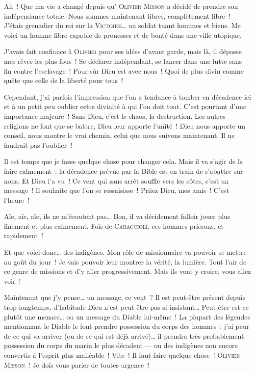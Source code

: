 {
		Ah~!  Que ma vie a changé depuis qu’ \textsc{Olivier Misson} a décidé de prendre son indépendance totale.
		Nous sommes maintenant libres, complètement libre~!
		J’étais grenadier du roi sur la \textsc{Victoire}… un soldat tuant hommes et biens.
		Me voici un homme libre capable de prouesses et de bonté dans une ville utopique.

		J’avais fait confiance à \textsc{Olivier} pour ses idées d’avant garde, mais là, il dépasse mes rêves les plus fous~!
		Se déclarer indépendant, se lancer dans une lutte sans fin contre l’esclavage~!
		Pour sûr Dieu est avec nous~!  Quoi de plus divin comme quête que celle de la liberté pour tous~!

		Cependant, j’ai parfois l’impression que l’on a tendance à tomber en décadence ici et à un petit peu oublier cette divinité à qui l’on doit tout.
		C’est pourtant d’une importance majeure~!  Sans Dieu, c’est le chaos, la destruction.
		Les autres religions ne font que se battre, Dieu leur apporte l’unité~!
		Dieu nous apporte un conseil, nous montre le vrai chemin, celui que nous suivons maintenant.
		Il ne faudrait pas l’oublier~!

		Il est temps que je fasse quelque chose pour changer cela.
		Mais il va s’agir de le faire calmement~:  la décadence prévue par la Bible est en train de s’abattre sur nous.
		Et Dieu l’a vu~!  Ce vent qui sans arrêt souffle vers les côtes, c’est un message~!
		Il souhaite que l’on se ressaisisse~!  Priiez Dieu, mes amis~!  C’est l’heure~!

		Aïe, aïe, aïe, ils ne m’écoutent pas…  Bon, il va décidement falloir jouer plus finement et plus calmement.
		Fois de \textsc{Caraccioli}, ces hommes prierons, et rapidement~!

		Et que voici donc… des indigènes.  Mon rôle de missionnaire va pouvoir se mettre au goût du jour~!
		Je vais pouvoir leur montrer la vérité, la lumière.
		Tout l’air de ce genre de missions et d’y aller progressivement.
		Mais ils vont y croire, vous allez voir~!

		Maintenant que j’y pense… un message, ce vent~?
		Il est peut-être présent depuis trop longtemps, d’habitude Dieu n’est peut-être pas si insistant…
		Peut-être est-ce plutôt une menace… ou un message du Diable lui-même~!
		La plupart des légendes mentionnant le Diable le font prendre possession du corps des hommes~:  j’ai peur de ce qui va arriver (ou de ce qui est déjà arrivé)… il prendra très probablement possession du corps du marin le plus décadent — ou des indigènes non encore convertis à l’esprit plus malléable~!
		Vite~!  Il faut faire quelque chose~!
		\textsc{Olivier Misson}~!  Je dois vous parler de toutes urgence~!
}

